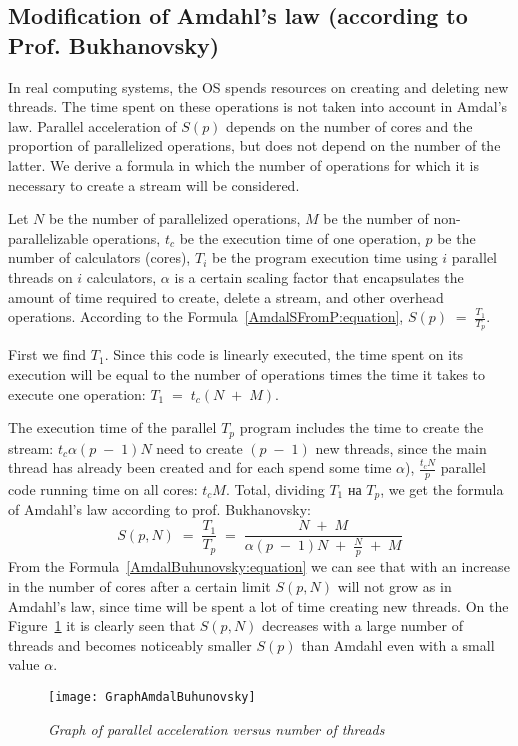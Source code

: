 { %
	\subsection{Modification of Amdahl's law (according to Prof. Bukhanovsky)}
	\par In real computing systems, the OS spends resources on creating and deleting new threads. The time spent on these operations is not taken into account in Amdal's law. Parallel acceleration of $ S (p) $ depends on the number of cores and the proportion of parallelized operations, but does not depend on the number of the latter. We derive a formula in which the number of operations for which it is necessary to create a stream will be considered.
	\par Let $N$ be the number of parallelized operations, $ M $ be the number of non-parallelizable operations,  $t_c$ be the execution time of one operation, $p$ be the number of calculators (cores), $T_i$ be the program execution time using $i$ parallel threads on $i$ calculators, $\alpha$ is a certain scaling factor that encapsulates the amount of time required to create, delete a stream, and other overhead operations.
According to the Formula~\eqref{AmdalSFromP:equation}, $S(p)\;=\;\frac{T_1}{T_p}$.
	\par First we find $ T_1 $. Since this code is linearly executed, the time spent on its execution will be equal to the number of operations times the time it takes to execute one operation: $T_1\;=\;t_c(N\;+\;M)$. 
	\par The execution time of the parallel $T_p$ program includes the time to create the stream: $t_c\alpha(p\;-\;1)N$ need to create $(p\;-\;1)$ new threads, since the main thread has already been created and for each spend some time $\alpha$),  $\frac {t_cN}p$ parallel code running time on all cores: $t_cM$. Total, dividing $T_1$ на $T_p$, we get the formula of Amdahl’s law according to prof. Bukhanovsky:
	\begin{equation}
		\label{AmdalBuhunovsky:equation}
		S(p,N)\;=\;\frac{T_1}{T_p}\;=\;\frac{N\;+\;M}{\alpha(p\;-\;1)N\;+\;\frac Np\;+\;M}
	\end{equation}
From the Formula~\eqref{AmdalBuhunovsky:equation} we can see that with an increase in the number of cores after a certain limit $S(p,N)$ will not grow as in Amdahl’s law, since time will be spent a lot of time creating new threads. On the Figure~\ref{GraphAmdalBuhunovsky:image} it is clearly seen that $S(p,N)$ decreases with a large number of threads and becomes noticeably smaller $S(p)$ than Amdahl even with a small value $\alpha$.
	\begin{figure}[H]
		\texttt{[image: GraphAmdalBuhunovsky]}
		\caption{\textit{Graph of parallel acceleration versus number of threads}}
		\label{GraphAmdalBuhunovsky:image}
	\end{figure}
}